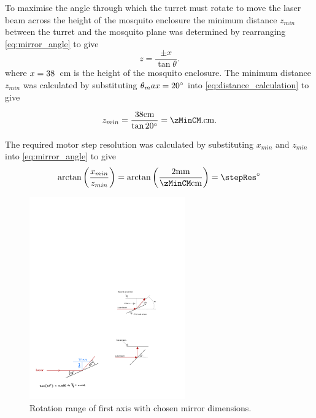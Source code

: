To maximise the angle through which the turret must rotate to move the laser beam across the height of the mosquito enclosure the minimum distance $z_{min}$ between the turret and the mosquito plane was determined by rearranging \autoref{eq:mirror_angle} to give
\begin{equation}
    z = \frac{\pm x}{\tan{\theta}}.
    \label{eq:distance_calculation}
\end{equation}
where $x = 38$~cm is the height of the mosquito enclosure. The minimum distance $z_{min}$ was calculated by substituting $\theta_max = 20^{\circ}$ into \autoref{eq:distance_calculation} to give

\begin{equation}
    z_{min} = \frac{\enclosureHeightCM \text{cm}}{\tan{20\degree}} = \zMinCM. \text{cm}.
    \label{eq:z_min_calculation}
\end{equation}

The required motor step resolution was calculated by substituting $x_{min}$ and $z_{min}$ into \autoref{eq:mirror_angle} to give
\begin{equation}
    \arctan\left({\frac{x_{min}}{z_{min}}}\right) = \arctan\left({\frac{\requiredLatStepSizeMM \text{mm}}{\zMinCM \text{cm}}}\right) = \stepRes\degree
    \label{eq:step_resolution_calculation}
\end{equation}

\begin{figure}[h]
    \centering
    \includegraphics[width=0.6\textwidth]{figures/hardware_design/rotation_range_of_first_axis.pdf}
    \caption{Rotation range of first axis with chosen mirror dimensions.}
    \label{fig:turret_motion_range}
\end{figure}

